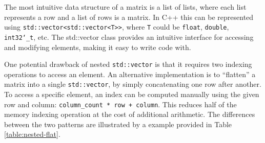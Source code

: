 \documentclass[logo,bsc,singlespacing,parskip]{infthesis}
\newcommand{\dtint}{\texttt{int32\char`_t}}
\newcommand{\dtfloat}{\texttt{float}}
\newcommand{\dtdouble}{\texttt{double}}
\begin{document}
The most intuitive data structure of a matrix is a list of lists, where each
list represents a row and a list of rows is a matrix. In C++ this can be
represented using \texttt{std::vector<std::vector<T>>}, where \texttt{T} could
be \dtfloat{}, \dtdouble{}, \dtint{}, etc. The std::vector
class provides an intuitive interface for accessing and modifying elements,
making it easy to write code with. 

One potential drawback of nested \texttt{std::vector} is that it requires two
indexing operations to access an element. An alternative implementation is to
“flatten” a matrix into a single \texttt{std::vector}, by simply concatenating
one row after another. To access a specific element, an index can be computed
manually using the given row and column: \texttt{column\_count * row + column}.
This reduces half of the memory indexing operation at the cost of additional
arithmetic. The differences between the two patterns are illustrated by a
example provided in Table \ref{table:nested-flat}. 
\end{document}
